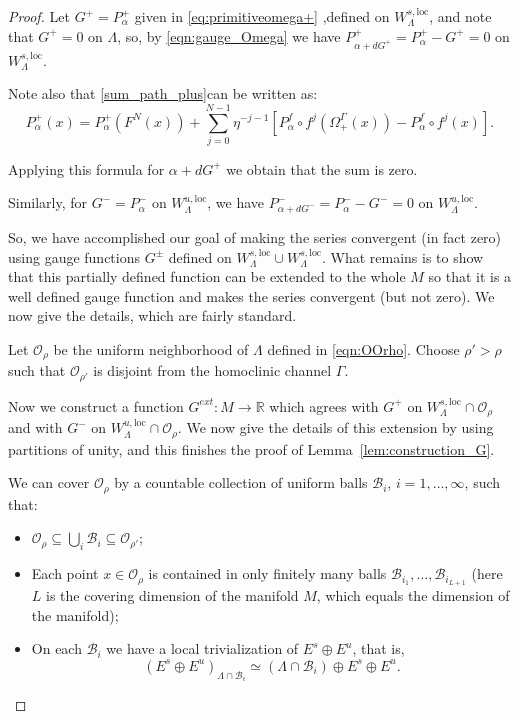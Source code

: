 \documentclass[11pt]{amsart}
\theoremstyle{definition}
\theoremstyle{remark}
\numberwithin{equation}{section}
\newcommand{\B}{\mathcal{B}}
\newcommand{\OO}{\mathcal{O}}
\begin{document}
\begin{proof}
  Let $G^+=P^+_\alpha$  given in \eqref{eq:primitiveomega+} ,defined on $W^{s,\textrm{loc}}_\Lambda$, and note that $G^+=0$ on $\Lambda$,
  so, by \eqref{eqn:gauge_Omega} we have
  $P^+_{\alpha+dG^+}=P^+_\alpha  - G^+=0$ on $W^{s,\textrm{loc}}_\Lambda$.

  Note also that \eqref{sum_path_plus}can be written as:
  \[
  P^+_\alpha(x)= P^+_\alpha(F^N(x))+\sum_{j=0}^{N-1}\eta^{-j-1}[P^f_\alpha\circ f^j(\Omega_+^\Gamma(x))-P^f_\alpha\circ f^j(x)].
\]

 Applying this formula for $\alpha+dG^+$ we obtain that the sum is zero.

  Similarly, for $G^-=P^-_\alpha$ on  $W^{u,\textrm{loc}}_\Lambda$, we have $P^-_{\alpha+dG^-}=P^-_\alpha - G^-=0$    on $W^{u,\textrm{loc}}_\Lambda$.


    So, we have accomplished our goal of making the series convergent (in fact zero) using gauge
    functions $G^\pm$ defined on $W^{s,\textrm{loc}}_\Lambda \cup  W^{s,\textrm{loc}}_\Lambda$.
    What remains is to show that this partially defined function can be extended to
    the whole $M$ so that it is a well defined gauge function and makes the series convergent (but not zero).
    We now give the details, which are fairly standard.


Let $\OO_\rho$ be the uniform neighborhood of $\Lambda$ defined in \eqref{eqn:OOrho}.
Choose $\rho'>\rho$ such that   $\OO_{\rho'}$ is disjoint from the homoclinic channel $\Gamma$.

Now we construct a function $G^{ext}:M\to\mathbb{R}$ which agrees with $G^+$ on $W^{s,\textrm{loc}}_\Lambda\cap \OO_\rho$
and with $G^-$ on $W^{u,\textrm{loc}}_\Lambda \cap \OO_\rho$.
We now give the details
of this  extension by using partitions of unity,  and this finishes the proof of
Lemma~\ref{lem:construction_G}.



We can cover $\OO_\rho$  by a countable collection of uniform balls $\B_i$,  $i=1,\ldots,\infty$,  such
that:
\begin{itemize}
\item[(C1)] $
\OO_\rho\subseteq \bigcup_{i} \B_i\subseteq \OO_{\rho'}$;
\item[(C2)]
Each point $x\in \OO_\rho$ is contained in only finitely many balls $\B_{ i_1} ,\ldots, \B_{ i_{L+1} }$  (here $L$ is the covering dimension of the manifold $M$, which equals the dimension of the manifold);
\item [(C3)]
On each $\B_i$ we have a  local trivialization  of $E^s\oplus E^u$, that is,
 \begin{equation}\label{eqn:trivialization}
   (E^s\oplus E^u)_{\Lambda\cap\B_i}\simeq (\Lambda\cap \B_i)\oplus E^s\oplus E^u.
\end{equation}
\end{itemize}



\end{proof}
\end{document}
